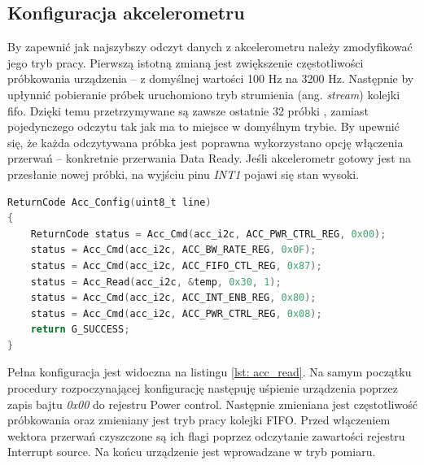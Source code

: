 \subsection{Konfiguracja akcelerometru}
By zapewnić jak najszybszy odczyt danych z akcelerometru należy zmodyfikować jego tryb pracy. Pierwszą istotną zmianą jest zwiększenie częstotliwości próbkowania urządzenia -- z domyślnej wartości 100 Hz na 3200 Hz. Następnie by upłynnić pobieranie próbek uruchomiono tryb strumienia (ang. \textit{stream}) kolejki \gls{fifo}. Dzięki temu przetrzymywane są zawsze ostatnie 32 próbki \cite{an1025}, zamiast pojedynczego odczytu tak jak ma to miejsce w domyślnym trybie. By upewnić się, że każda odczytywana próbka jest poprawna wykorzystano opcję włączenia przerwań -- konkretnie przerwania Data Ready. Jeśli akcelerometr gotowy jest na przesłanie nowej próbki, na wyjściu pinu \textit{INT1} pojawi się stan wysoki.  
\begin{lstlisting}[language=C,
caption={Funkcja konfigurująca akcelerometr},
label={lst: acc_config}]
ReturnCode Acc_Config(uint8_t line)
{
	ReturnCode status = Acc_Cmd(acc_i2c, ACC_PWR_CTRL_REG, 0x00);
	status = Acc_Cmd(acc_i2c, ACC_BW_RATE_REG, 0x0F);
	status = Acc_Cmd(acc_i2c, ACC_FIFO_CTL_REG, 0x87);
	status = Acc_Read(acc_i2c, &temp, 0x30, 1);
	status = Acc_Cmd(acc_i2c, ACC_INT_ENB_REG, 0x80);
	status = Acc_Cmd(acc_i2c, ACC_PWR_CTRL_REG, 0x08);
	return G_SUCCESS;
}
\end{lstlisting}
Pełna konfiguracja jest widoczna na listingu \ref{lst: acc_read}. Na samym początku procedury rozpoczynającej konfigurację następuję uśpienie urządzenia poprzez zapis bajtu \textit{0x00} do rejestru Power control. Następnie zmieniana jest częstotliwość próbkowania oraz zmieniany jest tryb pracy kolejki FIFO. Przed włączeniem wektora przerwań czyszczone są ich flagi poprzez odczytanie zawartości rejestru Interrupt source. Na końcu urządzenie jest wprowadzane w tryb pomiaru.

